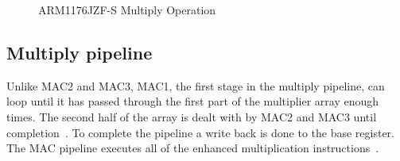 \documentclass[11pt]{report}
\begin{document}
\begin{figure}[H]
\caption{ARM1176JZF-S Multiply Operation}
\end{figure}
\subsection{Multiply pipeline}
\begin{onehalfspace}
Unlike MAC2 and MAC3, MAC1, the first stage in the multiply pipeline, can loop until it has passed through the first part of the multiplier array enough times. The second half of the array is dealt with by MAC2 and MAC3 until completion~\citep[1-28]{arm1176jzf-s}. To complete the pipeline a write back is done to the base register. The MAC pipeline executes all of the enhanced multiplication instructions~\citep[1-11]{arm1176jzf-s}. 
\end{onehalfspace}
\end{document}
